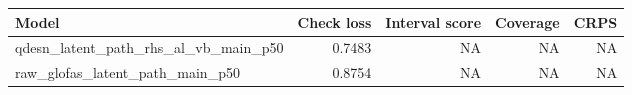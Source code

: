 \begin{tabular}{lrrrr}
\toprule
Model & Check loss & Interval score & Coverage & CRPS \\
\midrule
qdesn_latent_path_rhs_al_vb_main_p50 & 0.7483 & NA & NA & NA \\
raw_glofas_latent_path_main_p50 & 0.8754 & NA & NA & NA \\
\bottomrule
\end{tabular}
